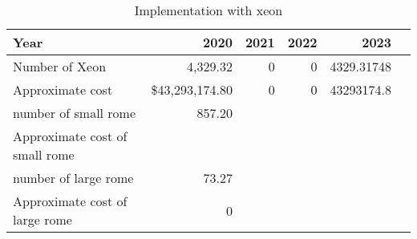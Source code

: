 \tiny \begin{longtable} { |p{}  |r  |r  |r  |r  |r |} 
\caption{Implementation with xeon \label{tab:Xeon}}\\ 
\hline 
\textbf{Year}&\textbf{2020}&\textbf{2021}&\textbf{2022}&\textbf{2023} \\ \hline
{Number of Xeon}&{4,329.32}&{0}&{0}&{4329.31748} \\ \hline
{Approximate cost}&{\$43,293,174.80}&{0}&{0}&{43293174.8} \\ \hline
{number of small rome }&{857.20}&&& \\ \hline
{Approximate cost of small rome }&&&& \\ \hline
{number of large rome }&{73.27}&&& \\ \hline
{Approximate cost of large rome }&{0}&&& \\ \hline
\end{longtable} \normalsize
